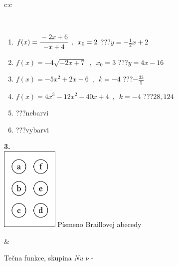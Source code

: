 \documentclass[10pt]{report}
\begin{document}
\begin{tabular}{c:c}
\begin{minipage}[c][104.5mm][t]{0.5\linewidth}
\begin{center}
\begin{minipage}{0.95\linewidth}
\begin{center}
\end{center}
\end{minipage}
\\[1mm]
\begin{minipage}{0.79\linewidth}
\begin{center}
\begin{varwidth}{\linewidth}
\begin{enumerate}
\small
\item $f(x)=\cfrac{-2x+6}{-x+4}\enspace , \enspace x_0=2$\quad \dotfill\; ???\;\dotfill \quad $y = -\frac{1}{2}x+2$
\item $f(x)=-4\sqrt{-2x+7}\enspace , \enspace x_0=3$\quad \dotfill\; ???\;\dotfill \quad $y = 4x-16$
\item $f(x)=-5x^2+2x-6\enspace , \enspace k=-4$\quad \dotfill\; ???\;\dotfill \quad $-\frac{33}{5}$
\item $f(x)=4x^3-12x^2-40x+4\enspace , \enspace k=-4$\quad \dotfill\; ???\;\dotfill \quad $28 , 124$
\item \quad \dotfill\; ???\;\dotfill \quad nebarvi
\item \quad \dotfill\; ???\;\dotfill \quad vybarvi
\end{enumerate}
\end{varwidth}
\end{center}
\end{minipage}
\begin{minipage}{0.20\linewidth}
\begin{center}
{\Huge\bfseries 3.} \\[2mm]
\includegraphics[height=40mm]{../images/braille.png}
{\small Písmeno Braillovej abecedy}
\end{center}
\end{minipage}
\end{center}
\end{minipage}
&
\begin{minipage}[c][104.5mm][t]{0.5\linewidth}
\begin{center}
\vspace{7mm}
{\huge Tečna funkce, skupina \textit{Nu $\nu$} -}\\[5mm]

\end{center}
\end{minipage}
\end{tabular}
\end{document}
